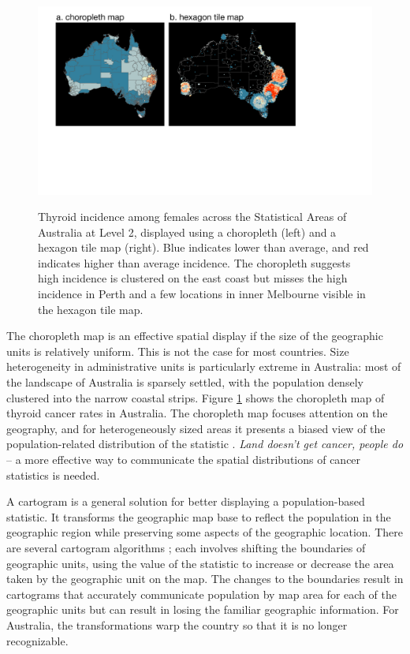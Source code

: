 \documentclass[times, doublespace]{anzsauth}
\begin{document}
\begin{figure}

{\centering 
\includegraphics[width=\linewidth]{figures/thyroid.pdf}
}

\caption{Thyroid incidence among females across the Statistical Areas of Australia at Level 2, displayed using a choropleth (left) and a hexagon tile map (right). Blue indicates lower than average, and red indicates higher than average incidence. The choropleth suggests high incidence is clustered on the east coast but misses the high incidence in Perth and a few locations in inner Melbourne visible in the hexagon tile map.}\label{fig:thyroid}
\end{figure}

The choropleth map is an effective spatial display if the size of the
geographic units is relatively uniform. This is not the case for most
countries. Size heterogeneity in administrative units is particularly
extreme in Australia: most of the landscape of Australia is sparsely
settled, with the population densely clustered into the narrow coastal
strips. Figure \ref{fig:thyroid} shows the choropleth map of thyroid
cancer rates in Australia. The choropleth map focuses attention on the
geography, and for heterogeneously sized areas it presents a biased view
of the population-related distribution of the statistic
\citep{CBATCC}. \emph{Land doesn't get cancer, people
do} -- a more effective way to communicate the spatial distributions of
cancer statistics is needed.

A cartogram is a general solution for better displaying a
population-based statistic. It transforms the geographic map base to
reflect the population in the geographic region while preserving some
aspects of the geographic location. There are several cartogram
algorithms \citep{ACTUC, CBATCC}; each involves shifting the boundaries of
geographic units, using the value of the statistic to increase or
decrease the area taken by the geographic unit on the map. The changes
to the boundaries result in cartograms that accurately communicate
population by map area for each of the geographic units but can result
in losing the familiar geographic information. For Australia, the
transformations warp the country so that it is no longer recognizable.
\end{document}
